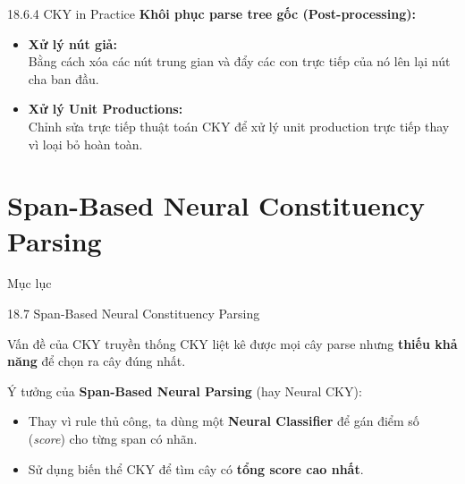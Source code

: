 \documentclass[11pt]{beamer}
\begin{document}
	\begin{frame}{18.6.4 CKY in Practice}
		\textbf{Khôi phục parse tree gốc (Post-processing):}
		
		\begin{itemize}
			\item \textbf{Xử lý nút giả:} \\
			Bằng cách xóa các nút trung gian và đẩy các con trực tiếp của nó lên lại nút cha ban đầu.
			\vspace{0.5cm}
			\item \textbf{Xử lý Unit Productions:} \\
			Chỉnh sửa trực tiếp thuật toán CKY để  xử lý unit production trực tiếp thay vì loại bỏ hoàn toàn.
			
		\end{itemize}
	\end{frame}
	
	\section{Span-Based Neural Constituency Parsing}
	\begin{frame}{Mục lục}
		\tableofcontents[currentsection]
	\end{frame}
	
	\begin{frame}{18.7 Span-Based Neural Constituency Parsing}
		\begin{block}{Vấn đề của CKY truyền thống}
			CKY liệt kê được mọi cây parse nhưng \textbf{thiếu khả năng} để chọn ra cây đúng nhất.
		\end{block}
		
		\vfill
		Ý tưởng của \textbf{Span-Based Neural Parsing} (hay Neural CKY):
		\begin{itemize}
			\item Thay vì rule thủ công, ta dùng một \textbf{Neural Classifier} để gán điểm số (\textit{score}) cho từng span có nhãn.
			\item Sử dụng biến thể CKY để tìm cây có \textbf{tổng score cao nhất}.
		\end{itemize}

	\end{frame}
	
\end{document}
